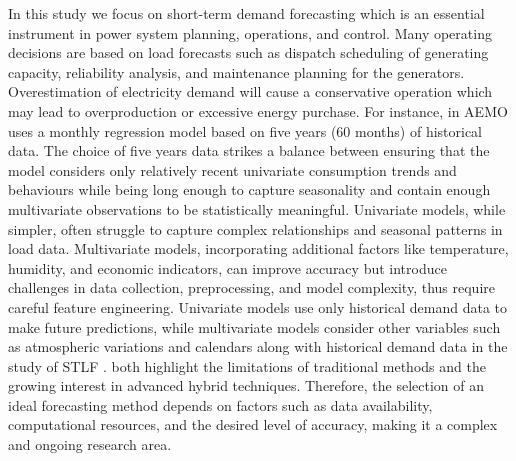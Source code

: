 \documentclass[mstat,12pt]{unswthesis}
\begin{document}
In this study we focus on short-term demand forecasting which is an
essential instrument in power system planning, operations, and control.
Many operating decisions are based on load forecasts such as dispatch
scheduling of generating capacity, reliability analysis, and maintenance
planning for the generators. Overestimation of electricity demand will
cause a conservative operation which may lead to overproduction or
excessive energy purchase. For instance, in \cite{AEMO} AEMO uses a
monthly regression model based on five years (60 months) of historical
data. The choice of five years data strikes a balance between ensuring
that the model considers only relatively recent univariate consumption
trends and behaviours while being long enough to capture seasonality and
contain enough multivariate observations to be statistically meaningful.
Univariate models, while simpler, often struggle to capture complex
relationships and seasonal patterns in load data. Multivariate models,
incorporating additional factors like temperature, humidity, and
economic indicators, can improve accuracy but introduce challenges in
data collection, preprocessing, and model complexity, thus require
careful feature engineering. Univariate models use only historical
demand data to make future predictions, while multivariate models
consider other variables such as atmospheric variations and calendars
along with historical demand data in the study of STLF
\cite{asi6060100}. \cite{wang2016review,chen2015electricity} both
highlight the limitations of traditional methods and the growing
interest in advanced hybrid techniques. Therefore, the selection of an
ideal forecasting method depends on factors such as data availability,
computational resources, and the desired level of accuracy, making it a
complex and ongoing research area.
\end{document}
